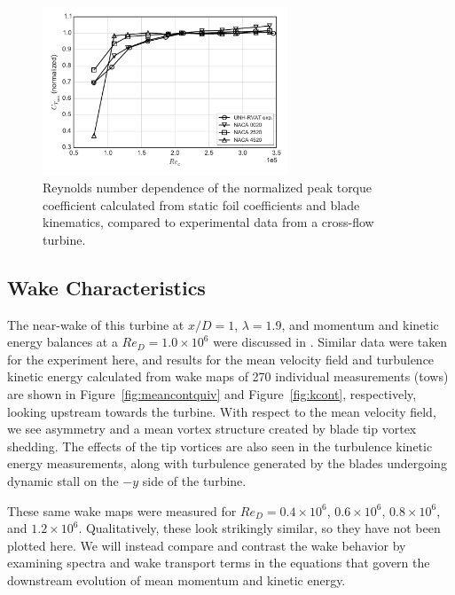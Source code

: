 \documentclass[energies,article,accept,moreauthors,pdftex,12pt,a4paper]{mdpi}
\begin{document}
\begin{figure}[ht!]
\centering

\includegraphics[width=0.65\textwidth]{figures/cft_re_dep_foils}

\caption{Reynolds number dependence of the normalized peak torque coefficient
calculated from static foil coefficients and blade kinematics, compared to
experimental data from a cross-flow turbine.}

\label{fig:foils-C_T-Re-dep}
\end{figure}




\subsection{Wake Characteristics}

The near-wake of this turbine at $x/D=1$, $\lambda=1.9$, and momentum and
kinetic energy balances at a $Re_D = 1.0 \times 10^6$ were discussed in
\cite{Bachant2015-JoT}. Similar data were taken for the experiment here, and
results for the mean velocity field and turbulence kinetic energy calculated
from wake maps of 270 individual measurements (tows) are shown in
Figure~\ref{fig:meancontquiv} and Figure~\ref{fig:kcont}, respectively, looking
upstream towards the turbine. With respect to the mean velocity field, we see
asymmetry and a mean vortex structure created by blade tip vortex shedding. The
effects of the tip vortices are also seen in the turbulence kinetic energy
measurements, along with turbulence generated by the blades undergoing dynamic
stall on the $-y$ side of the turbine.

These same wake maps were measured for $Re_D = 0.4 \times 10^6$, $0.6 \times
10^6$, $0.8 \times 10^6$, and $1.2 \times 10^6$. Qualitatively, these look
strikingly similar, so they have not been plotted here. We will instead compare
and contrast the wake behavior by examining spectra and wake transport terms in
the equations that govern the downstream evolution of mean momentum and kinetic
energy.
\end{document}
